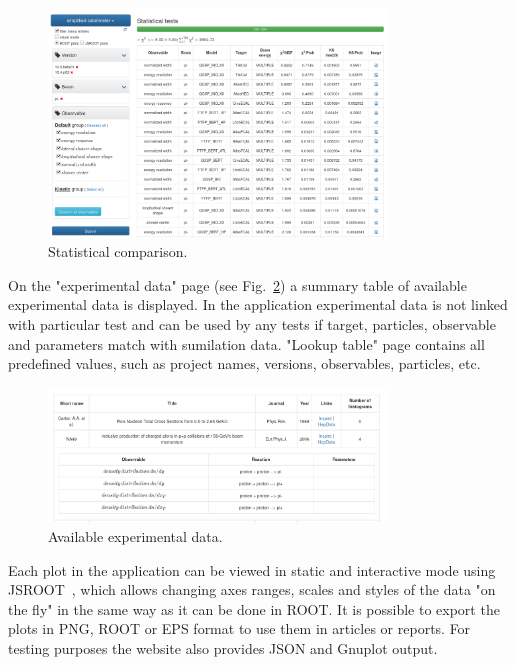 \begin{figure}[h]
    \centering
    \includegraphics[width=0.8\textwidth,clip]{statcomparison.png}
    \caption{Statistical comparison.}
    \label{fig:statcomparison}
\end{figure}

On the "experimental data" page (see Fig.~\ref{fig:exppage}) a summary table of available experimental data is displayed. In the application experimental data is not linked with particular test and can be used by any tests if target, particles, observable and parameters match with sumilation data.
"Lookup table" page contains all predefined values, such as project names, versions, observables, particles, etc.

\begin{figure}[h]
    \centering
    \includegraphics[width=0.8\textwidth,clip]{expdata.png}
    \caption{Available experimental data.}
    \label{fig:exppage}
\end{figure}

Each plot in the application can be viewed in static and interactive mode using JSROOT~\cite{JSROOT}, which allows changing axes ranges, scales and styles of the data "on the fly" in the same way as it can be done in ROOT. It is possible to export the plots in PNG, ROOT or EPS format to use them in articles or reports. For testing purposes the website also provides JSON and Gnuplot output.

